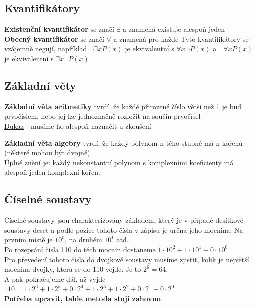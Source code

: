 \documentclass[12pt]{article}
\begin{document}
\subsection*{Kvantiﬁkátory}
\textbf{Existenční kvantifikátor} se značí $\exists$ a znamená existuje alespoň jeden\\
\textbf{Obecný kvantifikátor} se značí $\forall$ a znamená pro každé
Tyto kvantifikátory se vzájemně negují, například $\neg \exists x P(x)$ je ekvivalentní s $\forall x \neg P(x)$ a $\neg \forall x P(x)$ je ekvivalentní s $\exists x \neg P(x)$

\subsection*{Základní věty}
\textbf{Základní věta aritmetiky} tvrdí, že každé přirozené číslo větší než 1 je buď prvočíslem, nebo jej lze jednoznačně rozložit na součin prvočísel\\
\href{https://www.matweb.cz/zakladni-veta-aritmetiky/?value0=100&unit0=&outputUnit=}{\color{blue}Důkaz} - musíme ho alespoň naznačit u zkoušení

\textbf{Základní věta algebry} tvrdí, že každý polynom n-tého stupně má n kořenů (některé mohou být dvojné)\\
Úplné znění je: každý nekonstantní polynom s komplexními koeficienty má alespoň jeden komplexní kořen.\\

\subsection*{Číselné soustavy}
Číselné soustavy jsou charakterizovány základem, který je v případě desítkové soustavy deset a podle pozice tohoto čísla v zápisu je určna jeho mocnina. Na prvním místě je $10^0$, na druhém $10^1$ atd.\\
Po rozepsání čísla 110 do těch mocnin dostaneme $1 \cdot 10^2 + 1 \cdot 10^1 + 0 \cdot 10^0$\\ 
Pro převedení tohoto čísla do dvojkové soustavy musíme zjistit, kolik je největší mocnina dvojky, která se do 110 vejde. Je to $2^6 = 64$. \\
A pak pokračujeme dál, až vyjde $110 = 1 \cdot 2^6 + 1 \cdot 2^5 + 0 \cdot 2^4 + 1 \cdot 2^3 + 1 \cdot 2^2 + 0 \cdot 2^1 + 0 \cdot 2^0$\\
\textbf{Potřeba upravit, tahle metoda stojí zahovno}
\end{document}
